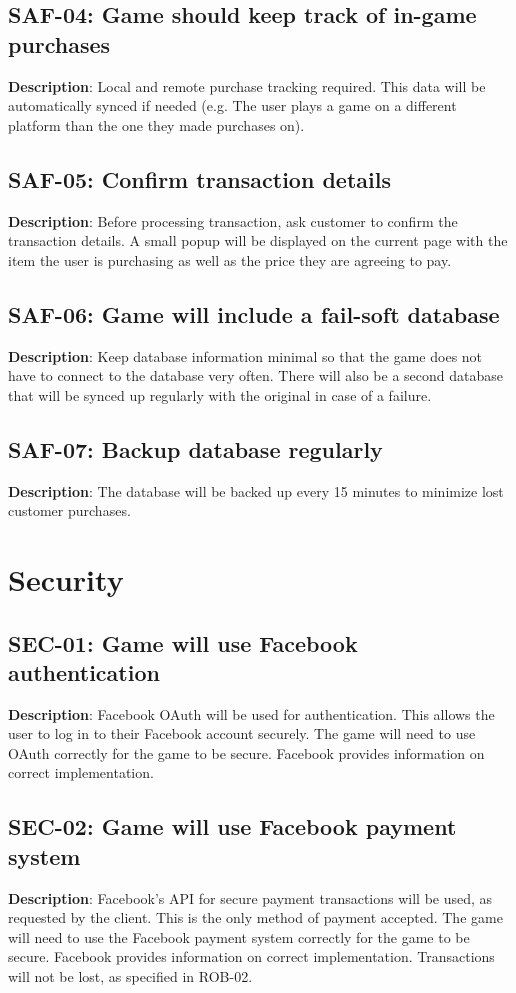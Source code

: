 \subsection{SAF-04: Game should keep track of in-game purchases}
\textbf{Description}: Local and remote purchase tracking required. This data
will be automatically synced if needed (e.g. The user plays a game
on a different platform than the one they made purchases on). 

\subsection{SAF-05: Confirm transaction details}
\textbf{Description}: Before processing transaction, ask customer to confirm
the transaction details. A small popup will be displayed on the current
page with the item the user is purchasing as well as the price they
are agreeing to pay.

\subsection{SAF-06: Game will include a fail-soft database}
\textbf{Description}: Keep database information minimal so that the game does
not have to connect to the database very often. There will also be
a second database that will be synced up regularly with the original
in case of a failure.

\subsection{SAF-07: Backup database regularly}
\textbf{Description}: The database will be backed up every 15 minutes to minimize
lost customer purchases.

\section{Security}

\subsection{SEC-01: Game will use Facebook authentication}
\textbf{Description}: Facebook OAuth will be used for authentication. This
allows the user to log in to their Facebook account securely. The
game will need to use OAuth correctly for the game to be secure. Facebook
provides information on correct implementation.

\subsection{SEC-02: Game will use Facebook payment system}
\textbf{Description}: Facebook\textquoteright{}s API for secure payment transactions
will be used, as requested by the client. This is the only method
of payment accepted. The game will need to use the Facebook payment
system correctly for the game to be secure. Facebook provides information
on correct implementation. Transactions will not be lost, as specified
in ROB-02.

